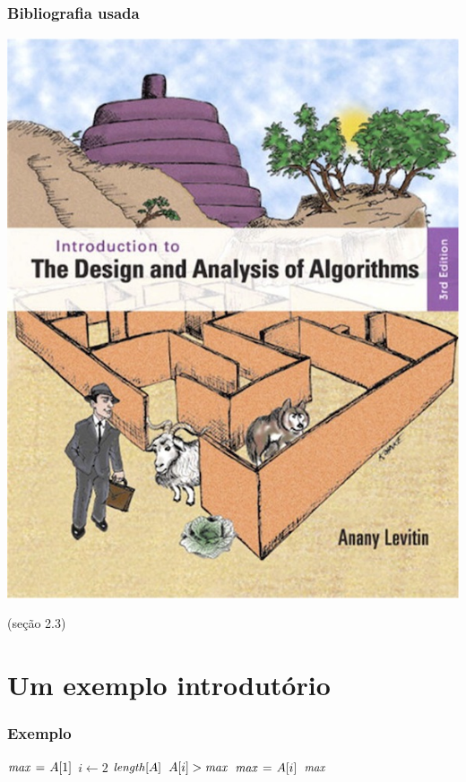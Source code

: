 \documentclass[handout]{beamer}
\begin{document}
\begin{frame}

  \frametitle{Bibliografia usada}

  \begin{center}
    \includegraphics[height=.8\textheight]{../img/capa-levitin.jpg}
  \end{center}
  (seção 2.3)
\end{frame}

\section{Um exemplo introdutório}

\begin{frame}
  \frametitle{Exemplo}

  \begin{example}
\begin{codebox}
\li $\id{max} \gets A[1]$
\li \For $i \gets 2$ \To $\id{length}[A]$
\li \Do
\li   \If $A[i] > \id{max}$
\li   \Then
        $\id{max} \gets A[i]$
      \End    
    \End    
\li \Return $\id{max}$
\end{codebox}
  \end{example}
\end{frame}
\end{document}
